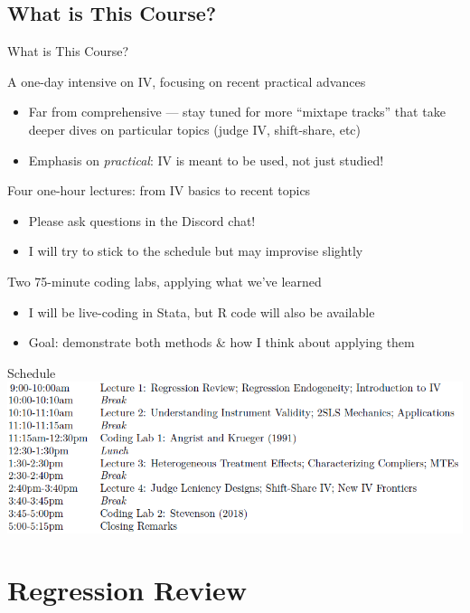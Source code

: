 \documentclass{beamer}
\begin{document}
\subsection{What is This Course?}
\begin{frame}{What is This Course?}

A one-day intensive on IV, focusing on recent practical advances \pause

\begin{itemize}
  \item Far from comprehensive --- stay tuned for more ``mixtape tracks'' that take deeper dives on particular topics (judge IV, shift-share, etc)
  \item Emphasis on \emph{practical}: IV is meant to be used, not just studied!
\end{itemize}\pause\medskip

Four one-hour lectures: from IV basics to recent topics

\begin{itemize}
  \item Please ask questions in the Discord chat!
  \item I will try to stick to the schedule but may improvise slightly
\end{itemize}\pause\medskip

Two 75-minute coding labs, applying what we've learned
\begin{itemize}
  \item I will be live-coding in Stata, but R code will also be available
  \item Goal: demonstrate both methods \& how I think about applying them
\end{itemize}

\end{frame}

\begin{frame}{Schedule}
\includegraphics[scale=0.55]{./lecture_includes/schedule.png}
\end{frame}

\section{Regression Review}
\end{document}
